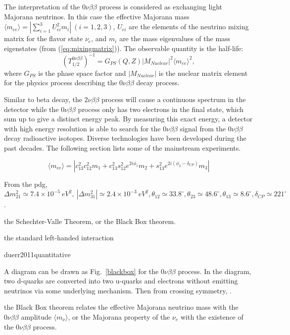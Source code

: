 The interpretation of the $0\nu\beta\beta$ process is considered as exchanging light Majorana neutrinos. In this case the effective Majorana mass $\langle m_{ee}\rangle=|\sum_{i=1}^{3} U_{ei}^2m_i|~(i=1,2,3)$, $U_{ei}$ are the elements of the neutrino mixing matrix for the flavor state $\nu_e$, and $m_i$ are the mass eigenvalues of the mass eigenstates (from (\ref{eq:mixingmatrix})). The observable quantity is the half-life:
\begin{equation}
(T^{0\nu\beta\beta}_{1/2})^{-1} = G_{PS}(Q,Z)|M_{Nuclear}|^2\langle m_{ee}\rangle^2, 
\end{equation}
where $G_{PS}$ is the phase space factor and $|M_{Nuclear}|$ is the nuclear matrix element for the physics process describing the $0\nu\beta\beta$ decay process\cite{zuber2011neutrino}.

Similar to beta decay, the $2\nu\beta\beta$ process will cause a continuous spectrum in the detector while the $0\nu\beta\beta$ process only has two electrons in the final state, which sum up to give a distinct energy peak. By measuring this exact energy, a detector with high energy resolution is able to search for the $0\nu\beta\beta$ signal from the $0\nu\beta\beta$ decay radioactive isotopes. Diverse technologies have been developed during the past decades. The following section lists some of the mainstream experiments.

\begin{equation}
\langle m_{ee} \rangle = |c^2_{13}c^2_{12}m_1+c^2_{13}s^2_{12}e^{2i\phi_1}m_2+s^2_{13}e^{2i(\phi_2-\delta_{CP})}m_3|
\end{equation}

From the pdg, $\Delta m^2_{21}\simeq 7.4\times 10^{-5}~eV^2,~|\Delta m^2_{31}|\simeq 2.4\times 10^{-3}~eV^2 ,\theta_{12}\simeq 33.8^\circ, \theta_{23}\simeq 48.6^\circ,\theta_{13}\simeq 8.6^\circ, \delta_{CP}\simeq 221^\circ$.

the Schechter-Valle Theorem, or the Black Box theorem.

the standard left-handed interaction


duerr2011quantitative  




A diagram can be drawn as Fig.~\ref{blackbox} for the $0\nu\beta\beta$ process.
In the diagram, two d-quarks are converted into two u-quarks and electrons without emitting neutrinos via some underlying mechanism. Then from crossing symmetry, \cite{akhmedov2014majorana}.

the Black Box theorem relates the effective Majorana neutrino mass with the $0\nu\beta\beta$ amplitude $\langle m_\nu\rangle$, or the Majorana property of the $\nu_e$ with the existence of the $0\nu\beta\beta$ process. 




